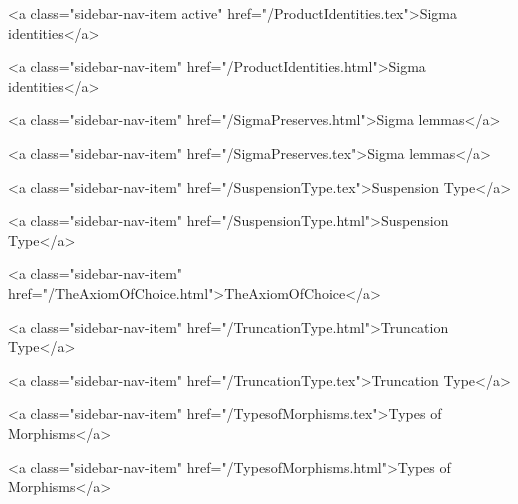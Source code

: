       
        
          <a class="sidebar-nav-item active" href="/ProductIdentities.tex">Sigma identities</a>
        
      
    
      
        
          <a class="sidebar-nav-item" href="/ProductIdentities.html">Sigma identities</a>
        
      
    
      
        
          <a class="sidebar-nav-item" href="/SigmaPreserves.html">Sigma lemmas</a>
        
      
    
      
        
          <a class="sidebar-nav-item" href="/SigmaPreserves.tex">Sigma lemmas</a>
        
      
    
      
        
          <a class="sidebar-nav-item" href="/SuspensionType.tex">Suspension Type</a>
        
      
    
      
        
          <a class="sidebar-nav-item" href="/SuspensionType.html">Suspension Type</a>
        
      
    
      
        
          <a class="sidebar-nav-item" href="/TheAxiomOfChoice.html">TheAxiomOfChoice</a>
        
      
    
      
        
          <a class="sidebar-nav-item" href="/TruncationType.html">Truncation Type</a>
        
      
    
      
        
          <a class="sidebar-nav-item" href="/TruncationType.tex">Truncation Type</a>
        
      
    
      
        
          <a class="sidebar-nav-item" href="/TypesofMorphisms.tex">Types of Morphisms</a>
        
      
    
      
        
          <a class="sidebar-nav-item" href="/TypesofMorphisms.html">Types of Morphisms</a>
        
